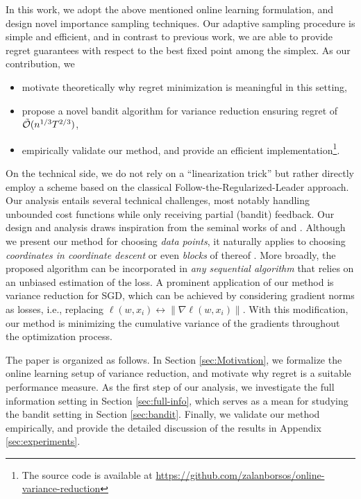 In this work, we adopt the above mentioned online learning formulation, and design novel importance sampling techniques. 
Our adaptive sampling procedure is simple and efficient, and 
in contrast to previous work, we are able to provide regret guarantees with respect to the best fixed point among the simplex.
As our contribution, we
\vspace{-1.5mm}
\begin{itemize}
\setlength\itemsep{0.05em}
\item motivate theoretically why regret minimization is meaningful in this setting, 
\item propose a novel bandit algorithm for variance reduction ensuring regret  of~$\tilde{\mathcal{O}}(n^{1/3}T^{2/3})$,
\item empirically validate our method, and provide an efficient implementation\footnote{The source code is available at  \url{https://github.com/zalanborsos/online-variance-reduction}}.
\end{itemize}
On the technical side, we do not rely on a ``linearization trick'' but rather directly employ a scheme based on the classical 
 Follow-the-Regularized-Leader approach. 
Our analysis entails several technical challenges, most notably handling  unbounded cost functions while only receiving partial (bandit) feedback. Our design and analysis draws inspiration from the seminal works of  \citet{auer2002nonstochastic}  and 
\cite{Abernethy08}. 
Although we present our method for choosing \emph{data points}, it naturally applies to choosing \emph{coordinates in coordinate descent} or even \emph{blocks} of thereof \citep{allen2016even,perekrestenko2017faster, nesterov2012efficiency, necoara2011random}.
More broadly, the proposed algorithm can be incorporated in \emph{any sequential algorithm} that relies on an unbiased estimation of the loss. A prominent  application of our method is variance reduction for SGD, which can be achieved by considering  gradient norms as  losses, i.e., replacing $\ell(w,x_i) \leftrightarrow \|\nabla \ell(w,x_i)\|$. With this modification, our method is minimizing the cumulative variance of the gradients throughout the optimization process.

The paper is organized as follows. In Section \ref{sec:Motivation}, we formalize the online learning setup of variance reduction, and motivate why regret is a suitable performance measure. As the first step of our analysis, we investigate the full information setting in Section \ref{sec:full-info}, which serves as a mean for studying the bandit setting in Section \ref{sec:bandit}. Finally, we validate our method empirically, and provide the detailed discussion of the results in Appendix  \ref{sec:experiments}. 




